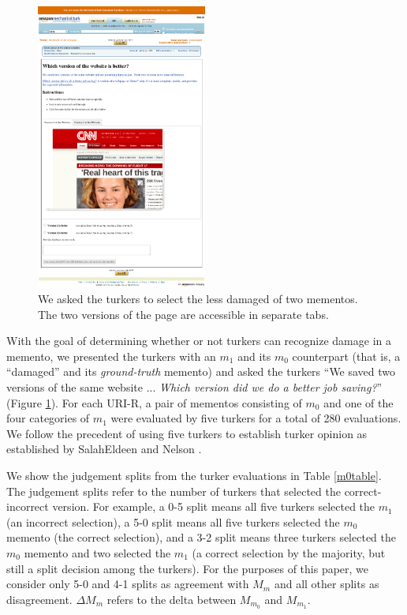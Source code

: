 \begin{figure}[h!]
\includegraphics[width=0.50\textwidth]{./imgs/turkss.png}
\caption{We asked the turkers to select the less damaged of two mementos. The two versions of the page are accessible in separate tabs.}
\label{turkss}
\end{figure}


With the goal of determining whether or not turkers can recognize damage in a memento, we presented the turkers with an $m_1$ and its $m_0$ counterpart (that is, a ``damaged'' and its \emph{ground-truth} memento) and asked the turkers ``We saved two versions of the same website ... \emph{Which version did we do a better job saving?}'' (Figure \ref{turkss}). For each URI-R, a pair of mementos consisting of $m_0$ and one of the four categories of $m_1$ were evaluated by five turkers for a total of 280 evaluations. We follow the precedent of using five turkers to establish turker opinion as established by SalahEldeen and Nelson \cite{hanyTurk}. 

We show the judgement splits from the turker evaluations in Table \ref{m0table}. The judgement splits refer to the number of turkers that selected the correct-incorrect version. For example, a 0-5 split means all five turkers selected the $m_1$ (an incorrect selection), a 5-0 split means all five turkers selected the $m_0$ memento (the correct selection), and a 3-2 split means three turkers selected the $m_0$ memento and two selected the $m_1$ (a correct selection by the majority, but still a split decision among the turkers). For the purposes of this paper, we consider only 5-0 and 4-1 splits as agreement with $M_m$ and all other splits as disagreement. {$\Delta M_m$} refers to the delta between $M_{m_0}$ and $M_{m_1}$.

